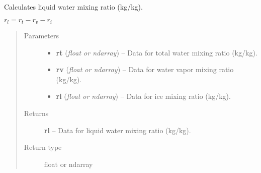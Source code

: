 \documentclass[letterpaper,10pt,english]{sphinxmanual}
\begin{document}
\begin{fulllineitems}
\label{atmos:atmos.equations.rl_from_rt_rv_ri}
Calculates liquid water mixing ratio (kg/kg).

\(r_l = r_t-r_v-r_i\)
\begin{quote}\begin{description}
\item[{Parameters}] \leavevmode\begin{itemize}
\item {} 
\textbf{rt} (\emph{float or ndarray}) -- Data for total water mixing ratio (kg/kg).

\item {} 
\textbf{rv} (\emph{float or ndarray}) -- Data for water vapor mixing ratio (kg/kg).

\item {} 
\textbf{ri} (\emph{float or ndarray}) -- Data for ice mixing ratio (kg/kg).

\end{itemize}

\item[{Returns}] \leavevmode
\textbf{rl} --
Data for liquid water mixing ratio (kg/kg).

\item[{Return type}] \leavevmode
float or ndarray

\end{description}\end{quote}

\end{fulllineitems}

\end{document}
